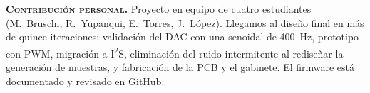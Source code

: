 \documentclass[10pt,a4paper]{article}
\newcommand{\contrib}[1]{%
  \par\vspace{4pt}{\color{rulegray}\hrule height 0.4pt}\vspace{3pt}
  {\color{navy}\scshape\bfseries Contribución personal.} #1\par}
\newcommand{\gap}{\par\vspace{5pt}\vfill}
\begin{document}
\gap
\contrib{Proyecto en equipo de cuatro estudiantes (M.~Bruschi, R.~Yupanqui, E.~Torres, J.~López). Llegamos al diseño final en más de quince iteraciones:
validación del DAC con una senoidal de 400~Hz, prototipo con PWM, migración a I\textsuperscript{2}S, eliminación del ruido intermitente al rediseñar la generación de muestras,
y fabricación de la PCB y el gabinete. El firmware está documentado y revisado en GitHub.}
\end{document}
